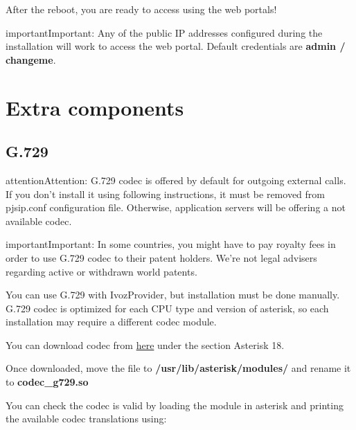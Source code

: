 \documentclass[letterpaper,10pt,english]{sphinxmanual}
\begin{document}
\noindent{}

After the reboot, you are ready to access using the web portals!

\begin{notice}{important}{Important:}
Any of the public IP addresses configured during the
installation will work to access the web portal. Default credentials are
\textbf{admin / changeme}.
\end{notice}


\section{Extra components}
\label{basic_concepts/installation/extra_components::doc}\label{basic_concepts/installation/extra_components:extra-components}

\subsection{G.729}
\label{basic_concepts/installation/extra_components:g-729}
\begin{notice}{attention}{Attention:}
G.729 codec is offered by default for outgoing external calls. If you
don't install it using following instructions, it must be removed from pjsip.conf
configuration file. Otherwise, application servers will be offering a not available codec.
\end{notice}

\begin{notice}{important}{Important:}
In some countries, you might have to pay royalty fees in order to
use G.729 codec to their patent holders. We're not legal advisers regarding
active or withdrawn world patents.
\end{notice}

You can use G.729 with IvozProvider, but installation must be done manually.
G.729 codec is optimized for each CPU type and version of asterisk, so each
installation may require a different codec module.

You can download codec from \href{http://asterisk.hosting.lv/}{here} under the
section Asterisk 18.

Once downloaded, move the  file to \textbf{/usr/lib/asterisk/modules/} and rename
it to \textbf{codec\_g729.so}

You can check the codec is valid by loading the module in asterisk and printing the
available codec translations using:
\end{document}
